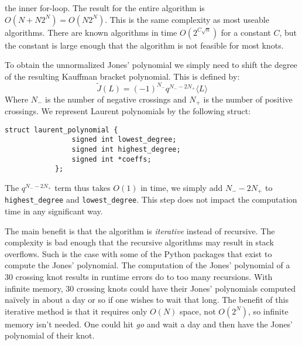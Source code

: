 \documentclass{article}
\theoremstyle{plain}
\begin{document}
        the inner for-loop. The result for the entire algorithm is
        $O(N+N2^{N})=O(N2^{N})$. This is the same complexity as most useable
        algorithms. There are known algorithms in time $O(2^{C\sqrt{n}})$ for a
        constant $C$, but the constant is large enough that the algorithm is
        not feasible for most knots.
        \par\hfill\par
        To obtain the unnormalized Jones' polynomial we simply need to shift
        the degree of the resulting Kauffman bracket polynomial. This is
        defined by:
        \begin{equation}
            \tilde{J}(L)=(-1)^{N_{-}}q^{N_{-}-2N_{+}}\langle{L}\rangle
        \end{equation}
        Where $N_{-}$ is the number of negative crossings and $N_{+}$ is the
        number of positive crossings. We represent Laurent polynomials by the
        following struct:
        \begin{lstlisting}[style=CStyle, gobble=12]
            struct laurent_polynomial {
                signed int lowest_degree;
                signed int highest_degree;
                signed int *coeffs;
            };
        \end{lstlisting}
        The $q^{N_{-}-2N_{+}}$ term thus takes $O(1)$ in time, we simply
        add $N_{-}-2N_{+}$ to \texttt{highest\_degree} and
        \texttt{lowest\_degree}. This step does not impact the computation time
        in any significant way.
        \par\hfill\par
        The main benefit is that the algorithm is \textit{iterative} instead of
        recursive. The complexity is bad enough that the recursive
        algorithms may result in stack overflows. Such is the case with some of
        the Python packages that exist to compute the Jones' polynomial. The
        computation of the Jones' polynomial of a 30 crossing knot results in
        runtime errors do to too many recursions. With infinite memory, 30
        crossing knots could have their Jones' polynomials computed na\"{i}vely
        in about a day or so if one wishes to wait that long. The benefit of
        this iterative method is that it requires only $O(N)$ space,
        not $O(2^{N})$, so infinite memory isn't needed. One could hit
        \textit{go} and wait a day and then have the Jones' polynomial of their
        knot.
\end{document}
